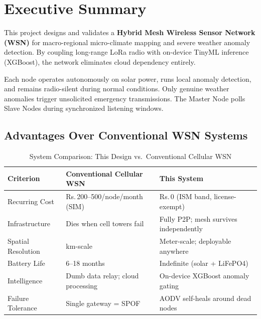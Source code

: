 \documentclass[12pt,a4paper]{article}
\begin{document}
\newpage

\section{Executive Summary}

This project designs and validates a \textbf{Hybrid Mesh Wireless Sensor Network (WSN)} for macro-regional micro-climate mapping and severe weather anomaly detection. By coupling long-range LoRa radio with on-device TinyML inference (XGBoost), the network eliminates cloud dependency entirely.

Each node operates autonomously on solar power, runs local anomaly detection, and remains radio-silent during normal conditions. Only genuine weather anomalies trigger unsolicited emergency transmissions. The Master Node polls Slave Nodes during synchronized listening windows.

\subsection{Advantages Over Conventional WSN Systems}

\begin{table}[h!]
\centering
\caption{System Comparison: This Design vs.\ Conventional Cellular WSN}
\begin{tabularx}{\textwidth}{L{3.5cm} L{4.5cm} L{5.5cm}}
\toprule
\textbf{Criterion} & \textbf{Conventional Cellular WSN} & \textbf{This System} \\
\midrule
Recurring Cost & Rs.\,200--500/node/month (SIM) & Rs.\,0 (ISM band, license-exempt) \\
Infrastructure & Dies when cell towers fail & Fully P2P; mesh survives independently \\
Spatial Resolution & km-scale & Meter-scale; deployable anywhere \\
Battery Life & 6--18 months & Indefinite (solar + LiFePO4) \\
Intelligence & Dumb data relay; cloud processing & On-device XGBoost anomaly gating \\
Failure Tolerance & Single gateway = SPOF & AODV self-heals around dead nodes \\
\bottomrule
\end{tabularx}
\end{table}

\end{document}
